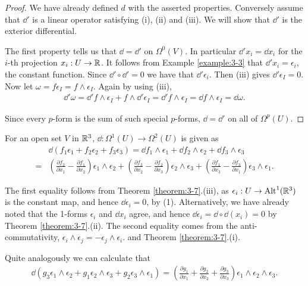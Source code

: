 \begin{proof}
We have already defined $d$ with the asserted properties. Conversely assume
that $\dd'$ is a linear operator satisfying (i), (ii) and (iii). We will show that $\dd'$ is
the exterior differential.

The first property tells us that $\dd = \dd'$ on $\Omega^0(V)$. In particular $\dd' x_i = \dd x_i$ for the
$i$-th projection $x_i:U\to\mathbb{R}$. It follows from Example \ref{example:3-3} that $\dd' x_i = \epsilon_i$, 
the constant function. Since $\dd'\circ\dd' = 0$ we have that $\dd'\epsilon_i$. Then (iii) gives $\dd'\epsilon_I = 0$. 
Now let $\omega = f\epsilon_I = f\wedge\epsilon_I$. Again by using (iii),
\begin{align*}
  \dd'\omega = \dd'f\wedge\epsilon_I + f\wedge \dd'\epsilon_I
  = \dd'f\wedge\epsilon_I
  = \dd f\wedge\epsilon_I
  = \dd\omega.  
\end{align*}

Since every $p$-form is the sum of such special $p$-forms, $\dd = \dd'$ on all of $\Omega^p(U)$.
\end{proof}

For an open set $V$ in $\mathbb{R}^3$, $\dd:\Omega^1(U)\to\Omega^2(U)$ is given as 
\begin{align*}
  & \dd(f_1\epsilon_1+f_2\epsilon_2+f_3\epsilon_3)
  = \dd f_1\wedge\epsilon_1+\dd f_2\wedge\epsilon_2+\dd f_3\wedge\epsilon_3 \\
  = & \left(\frac{\partial f_{2}}{\partial x_{1}} - \frac{\partial f_{1}}{\partial x_{2}}\right)\epsilon_{1}\wedge\epsilon_{2}
    + \left(\frac{\partial f_{3}}{\partial x_{2}} - \frac{\partial f_{2}}{\partial x_{3}}\right)\epsilon_{2}\wedge\epsilon_{3}
    + \left(\frac{\partial f_{1}}{\partial x_{3}} - \frac{\partial f_{3}}{\partial x_{1}}\right)\epsilon_{3}\wedge\epsilon_{1}.
\end{align*}

The first equality follows from Theorem \ref{theorem:3-7}.(iii), as $\epsilon_i:U\to\operatorname{Alt}^1(\mathbb{R}^3)$ is the
constant map, and hence $\dd\epsilon_i=0$, by (1). Alternatively, we have already noted
that the 1-forms $\epsilon_i$ and $\dd x_i$ agree, and hence $\dd\epsilon_i = \dd\circ\dd(x_i) = 0$ 
by Theorem \ref{theorem:3-7}.(ii). The second equality comes from the anti-commutativity, $\epsilon_i\wedge\epsilon_j = -\epsilon_j\wedge\epsilon_i$.
and Theorem \ref{theorem:3-7}.(i).

Quite analogously we can calculate that
\begin{align*}
  \dd(g_3\epsilon_1\wedge\epsilon_2+g_1\epsilon_2\wedge\epsilon_3+g_2\epsilon_3\wedge\epsilon_1)
  = \left(\frac{\partial g_1}{\partial x_1}+\frac{\partial g_2}{\partial x_2}+\frac{\partial g_3}{\partial x_3}\right)
    \epsilon_1\wedge\epsilon_2\wedge\epsilon_3.
\end{align*}

